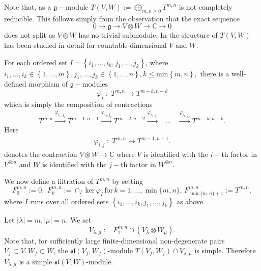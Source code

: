 \documentclass[10pt]{amsart}
\newcommand {\CC} {\mathbb {C}}
\renewcommand{\sl}{\mathfrak{sl}}
\renewcommand{\gg}{\mathfrak{g}}
\begin{document}
Note that, as a $\gg-$module $T(V,W):=\bigoplus_{m,n\geq 0} T^{m,n}$ is not completely reducible. This follows simply from the observation that the exact sequence
\begin{equation}\label{seqv}
 0 \rightarrow \gg \rightarrow V \otimes W \rightarrow \CC \rightarrow 0
\end{equation}
does not split as $V \otimes W$ has no trivial submodule. In \cite{pstyr} the structure of $T(V,W)$ has been studied in detail for 
countable-dimensional $V$ and $W$.

For each ordered set 
$I=\left\lbrace i_1, \dots, i_k, j_1, \dots, j_k\right\rbrace$, where $i_1, \dots, i_k \in \left\lbrace1,\dots,m\right\rbrace, j_1,\dots,j_k \in \left\lbrace1,\dots,n\right\rbrace, k \leq \mathrm{min}\left\lbrace m,n \right\rbrace,$ 
there is a well-defined morphism of $\gg-$modules
\begin{equation}\label{comp_contr}
 \varphi_I\; : \; T^{m,n} \longrightarrow T^{m-k,n-k}
\end{equation}
which is simply the composition of contractions
\begin{eqnarray}\label{contr}
 T^{m,n} \xrightarrow{\varphi_{i_1,j_1}} T^{m-1,n-1} \xrightarrow{\varphi_{i_2,j_2}} T^{m-2,n-2} \xrightarrow{\varphi_{i_3,j_3}} &\dots& \xrightarrow{\varphi_{i_k,j_k}} T^{m-k,n-k}.
\end{eqnarray}
 Here
\begin{eqnarray}
\varphi_{i,j} \; : \; T^{m,n} \longrightarrow T^{m-1,n-1}.
\end{eqnarray}
denotes the contraction $V \otimes W \rightarrow \CC$ where $V$ is identified with the $i-$th factor in $V^{\otimes m}$ and $W$ is identified with the 
$j-$th factor in $W^{\otimes n}$.

We now define a filtration of $T^{m,n}$ by setting
\begin{equation}\label{gen_soc}
F^{m,n}_0:=0,\,\,F^{m,n}_k:= \cap_I\, \mathrm{ker}\, \varphi_I\,\text{for}\,k=1,\dots,\min\lbrace m,n\rbrace,\,F^{m,n}_{\min \lbrace m,n\rbrace + 1}:=T^{m,n}, 
\end{equation}
where $I$ runs over all ordered sets 
$\left\lbrace i_1,\dots,i_{k},j_1,\dots,j_{k}\right\rbrace$ as above.

Let $|\lambda|=m,|\mu|=n$. We set
$$V_{\lambda,\mu}:=F^{m,n}_1\cap  (V_{\lambda} \otimes W_{\mu}).$$ 
Note that, for sufficiently large finite-dimensional non-degenerate pairs $V_f\subset V, W_f\subset W$, the $\sl(V_f,W_f)$-module $T(V_f,W_f)\cap V_{\lambda,\mu}$ is simple.
Therefore $V_{\lambda,\mu}$ is a simple $\sl(V,W)$-module.
\end{document}

